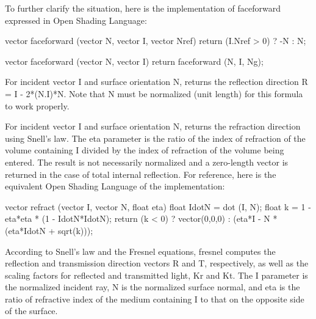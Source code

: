 \documentclass[11pt,letterpaper]{book}
\def\langname{Open Shading Language\xspace}
\begin{document}
To further clarify the situation, here is the implementation of
{\cf faceforward} expressed in \langname:

\begin{code}
vector faceforward (vector N, vector I, vector Nref)
{
    return (I.Nref > 0) ? -N : N;
}

vector faceforward (vector N, vector I)
{
    return faceforward (N, I, Ng);
}
\end{code}
\apiend

For incident vector {\cf I} and surface orientation {\cf N}, returns the
reflection direction {\cf R = I - 2*(N.I)*N}.  Note that {\cf N} must be
normalized (unit length) for this formula to work properly.
\apiend

For incident vector {\cf I} and surface orientation {\cf N}, 
returns the refraction direction using Snell's law. The {\cf eta} 
parameter is the ratio of the index of refraction of the volume containing
{\cf I} divided by the index of refraction of the volume being entered.
The result is not necessarily normalized and a zero-length vector is 
returned in the case of total internal reflection.  
For reference, here is the equivalent \langname of the implementation:

\begin{code}
vector refract (vector I, vector N, float eta)
{
    float IdotN = dot (I, N);
    float k = 1 - eta*eta * (1 - IdotN*IdotN);
    return (k < 0) ? vector(0,0,0) : (eta*I - N * (eta*IdotN + sqrt(k)));
}
\end{code}
\apiend

According to Snell's law and the Fresnel equations, {\cf fresnel}
computes the reflection and transmission direction vectors {\cf R} and
{\cf T}, respectively, as well as the scaling factors for reflected
and transmitted light, {\cf Kr} and {\cf Kt}.  The {\cf I} parameter
is the normalized incident ray, {\cf N} is the normalized surface normal,
and {\cf eta} is the ratio of refractive index of the medium
containing {\cf I} to that on the opposite side of the surface.
\apiend
\end{document}
